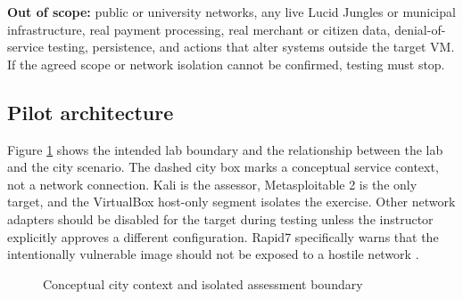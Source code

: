 \documentclass[11pt,a4paper]{article}
\begin{document}
\textbf{Out of scope:} public or university networks, any live Lucid Jungles or municipal infrastructure, real payment processing, real merchant or citizen data, denial-of-service testing, persistence, and actions that alter systems outside the target VM. If the agreed scope or network isolation cannot be confirmed, testing must stop.

\subsection{Pilot architecture}
Figure \ref{fig:architecture} shows the intended lab boundary and the relationship between the lab and the city scenario. The dashed city box marks a conceptual service context, not a network connection. Kali is the assessor, Metasploitable 2 is the only target, and the VirtualBox host-only segment isolates the exercise. Other network adapters should be disabled for the target during testing unless the instructor explicitly approves a different configuration. Rapid7 specifically warns that the intentionally vulnerable image should not be exposed to a hostile network \citep{rapid7_metasploitable}.

\begin{figure}[H]
\centering
{}
\caption{Conceptual city context and isolated assessment boundary}
\label{fig:architecture}
\end{figure}
\end{document}
